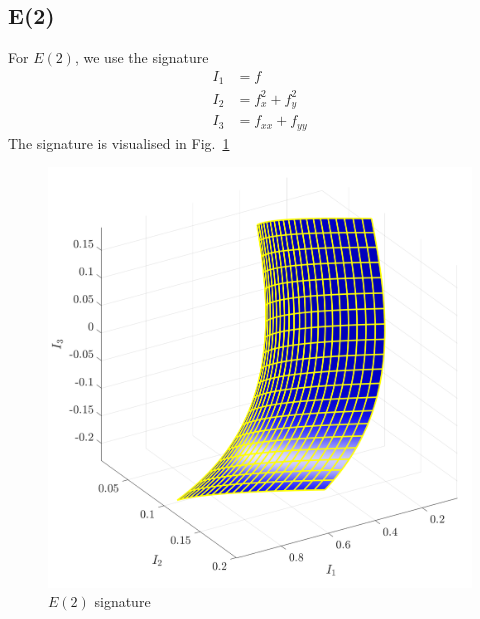 \documentclass[11pt]{article}
\begin{document}
\subsection{E(2)}
For $E(2)$, we use the signature
\begin{equation}\label{eq:e2sig}
  \begin{split}
    I_1 &= f \\
    I_2 &= f_x^2 + f_y^2 \\
    I_3 &= f_{xx} + f_{yy}
  \end{split}
\end{equation}
The signature is visualised in Fig.~\ref{fig:e2signature}
\begin{figure}
  \centering
    \includegraphics[width=12cm]{figures/E2_signature}
  \caption{$E(2)$ signature}
  \label{fig:e2signature}
\end{figure}
\end{document}
